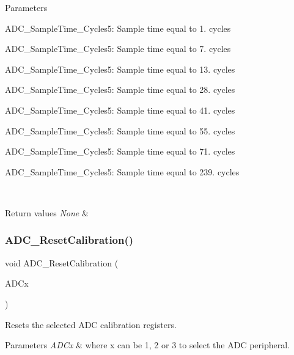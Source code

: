 \begin{DoxyParams}{Parameters}
\begin{DoxyItemize}
\item A\+D\+C\+\_\+\+Sample\+Time\+\_\+Cycles5\+: Sample time equal to 1. cycles \item A\+D\+C\+\_\+\+Sample\+Time\+\_\+Cycles5\+: Sample time equal to 7. cycles \item A\+D\+C\+\_\+\+Sample\+Time\+\_\+Cycles5\+: Sample time equal to 13. cycles \item A\+D\+C\+\_\+\+Sample\+Time\+\_\+Cycles5\+: Sample time equal to 28. cycles \item A\+D\+C\+\_\+\+Sample\+Time\+\_\+Cycles5\+: Sample time equal to 41. cycles \item A\+D\+C\+\_\+\+Sample\+Time\+\_\+Cycles5\+: Sample time equal to 55. cycles \item A\+D\+C\+\_\+\+Sample\+Time\+\_\+Cycles5\+: Sample time equal to 71. cycles \item A\+D\+C\+\_\+\+Sample\+Time\+\_\+Cycles5\+: Sample time equal to 239. cycles\end{DoxyItemize}
\\
\hline
\end{DoxyParams}

\begin{DoxyRetVals}{Return values}
{\em None} & \\
\hline
\end{DoxyRetVals}
\mbox{\label{group___a_d_c___exported___functions_ga3d542020ba28c1d16238a0defbee6d8f}} 
\subsubsection{\texorpdfstring{ADC\_ResetCalibration()}{ADC\_ResetCalibration()}}
{\footnotesize\ttfamily void A\+D\+C\+\_\+\+Reset\+Calibration (\begin{DoxyParamCaption}\item[{\mbox{\hyperlink{struct_a_d_c___type_def}{A\+D\+C\+\_\+\+Type\+Def}} $\ast$}]{A\+D\+Cx }\end{DoxyParamCaption})}



Resets the selected A\+DC calibration registers. 


\begin{DoxyParams}{Parameters}
{\em A\+D\+Cx} & where x can be 1, 2 or 3 to select the A\+DC peripheral. \\
\hline
\end{DoxyParams}

